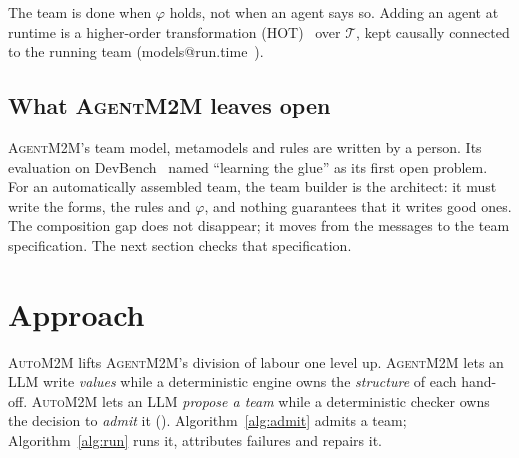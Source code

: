 \documentclass[10pt,conference]{IEEEtran}
\theoremstyle{definition}
\newcommand{\tool}{\textsc{AgentM2M}}
\newcommand{\auto}{\textsc{AutoM2M}}
\newcommand{\team}{\mathcal{T}}
\begin{document}
The team is done when $\varphi$ holds, not when an agent says so. Adding an
agent at runtime is a higher-order transformation (HOT)~\cite{tisi2009hot}
over $\team$, kept causally connected to the running team
(models@run.time~\cite{blair2009runtime}).

\subsection{What \tool{} leaves open}

\tool{}'s team model, metamodels and rules are written by a person. Its
evaluation on DevBench~\cite{li2024devbench} named ``learning the glue'' as
its first open problem. For an automatically assembled team, the team
builder is the architect: it must write the forms, the rules and $\varphi$, and
nothing guarantees that it writes good ones. The composition gap does not
disappear; it moves from the messages to the team specification. The next
section checks that specification.

\section{Approach}\label{sec:approach}

\auto{} lifts \tool{}'s division of labour one level up. \tool{} lets an LLM
write \emph{values} while a deterministic engine owns the \emph{structure} of
each hand-off. \auto{} lets an LLM \emph{propose a team} while a
deterministic checker owns the decision to \emph{admit} it
(). Algorithm~\ref{alg:admit} admits a team;
Algorithm~\ref{alg:run} runs it, attributes failures and repairs it.
\end{document}

